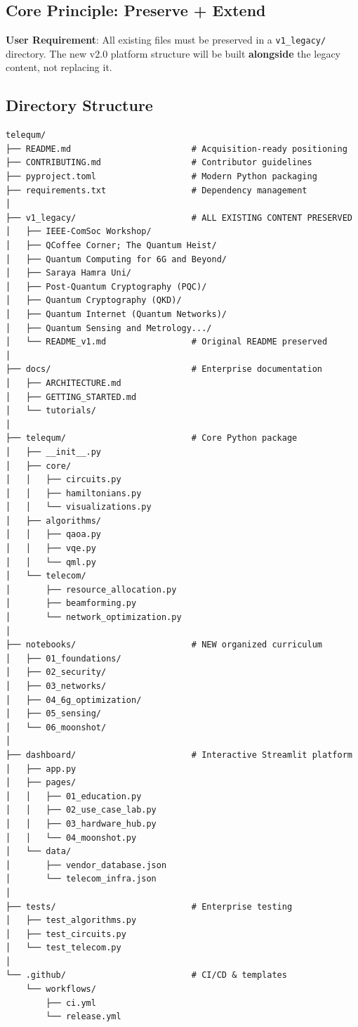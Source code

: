\documentclass[11pt,a4paper]{article}
\begin{document}
\subsection{Core Principle: Preserve + Extend}

\begin{importantbox}
\textbf{User Requirement}: All existing files must be preserved in a \texttt{v1\_legacy/} directory. The new v2.0 platform structure will be built \textbf{alongside} the legacy content, not replacing it.
\end{importantbox}

\subsection{Directory Structure}

\begin{lstlisting}[caption={Proposed v2.0 Directory Structure}]
telequm/
├── README.md                        # Acquisition-ready positioning
├── CONTRIBUTING.md                  # Contributor guidelines
├── pyproject.toml                   # Modern Python packaging
├── requirements.txt                 # Dependency management
│
├── v1_legacy/                       # ALL EXISTING CONTENT PRESERVED
│   ├── IEEE-ComSoc Workshop/
│   ├── QCoffee Corner; The Quantum Heist/
│   ├── Quantum Computing for 6G and Beyond/
│   ├── Saraya Hamra Uni/
│   ├── Post-Quantum Cryptography (PQC)/
│   ├── Quantum Cryptography (QKD)/
│   ├── Quantum Internet (Quantum Networks)/
│   ├── Quantum Sensing and Metrology.../
│   └── README_v1.md                 # Original README preserved
│
├── docs/                            # Enterprise documentation
│   ├── ARCHITECTURE.md
│   ├── GETTING_STARTED.md
│   └── tutorials/
│
├── telequm/                         # Core Python package
│   ├── __init__.py
│   ├── core/
│   │   ├── circuits.py
│   │   ├── hamiltonians.py
│   │   └── visualizations.py
│   ├── algorithms/
│   │   ├── qaoa.py
│   │   ├── vqe.py
│   │   └── qml.py
│   └── telecom/
│       ├── resource_allocation.py
│       ├── beamforming.py
│       └── network_optimization.py
│
├── notebooks/                       # NEW organized curriculum
│   ├── 01_foundations/
│   ├── 02_security/
│   ├── 03_networks/
│   ├── 04_6g_optimization/
│   ├── 05_sensing/
│   └── 06_moonshot/
│
├── dashboard/                       # Interactive Streamlit platform
│   ├── app.py
│   ├── pages/
│   │   ├── 01_education.py
│   │   ├── 02_use_case_lab.py
│   │   ├── 03_hardware_hub.py
│   │   └── 04_moonshot.py
│   └── data/
│       ├── vendor_database.json
│       └── telecom_infra.json
│
├── tests/                           # Enterprise testing
│   ├── test_algorithms.py
│   ├── test_circuits.py
│   └── test_telecom.py
│
└── .github/                         # CI/CD & templates
    └── workflows/
        ├── ci.yml
        └── release.yml
\end{lstlisting}
\end{document}
